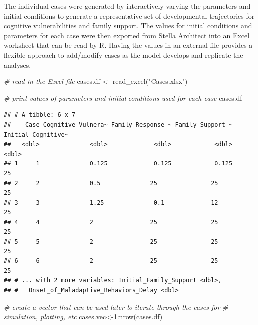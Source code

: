 \documentclass[
]{article}
\newenvironment{Shaded}{\begin{snugshade}}{\end{snugshade}}
\newcommand{\CommentTok}[1]{\textcolor[rgb]{0.56,0.35,0.01}{\textit{#1}}}
\newcommand{\DecValTok}[1]{\textcolor[rgb]{0.00,0.00,0.81}{#1}}
\newcommand{\FunctionTok}[1]{\textcolor[rgb]{0.00,0.00,0.00}{#1}}
\newcommand{\NormalTok}[1]{#1}
\newcommand{\OtherTok}[1]{\textcolor[rgb]{0.56,0.35,0.01}{#1}}
\newcommand{\SpecialCharTok}[1]{\textcolor[rgb]{0.00,0.00,0.00}{#1}}
\newcommand{\StringTok}[1]{\textcolor[rgb]{0.31,0.60,0.02}{#1}}
\begin{document}
The individual cases were generated by interactively varying the
parameters and initial conditions to generate a representative set of
developmental trajectories for cognitive vulnerabilities and family
support. The values for initial conditions and parameters for each case
were then exported from Stella Architect into an Excel worksheet that
can be read by R. Having the values in an external file provides a
flexible approach to add/modify cases as the model develops and
replicate the analyses.

\begin{Shaded}
\begin{Highlighting}[]
\CommentTok{\# read in the Excel file}
\NormalTok{cases.df }\OtherTok{\textless{}{-}} \FunctionTok{read\_excel}\NormalTok{(}\StringTok{"Cases.xlsx"}\NormalTok{)}

\CommentTok{\# print values of parameters and initial conditions used for each case}
\NormalTok{cases.df}
\end{Highlighting}
\end{Shaded}

\begin{verbatim}
## # A tibble: 6 x 7
##    Case Cognitive_Vulnera~ Family_Response_~ Family_Support_~ Initial_Cognitive~
##   <dbl>              <dbl>             <dbl>            <dbl>              <dbl>
## 1     1              0.125             0.125            0.125                 25
## 2     2              0.5              25               25                     25
## 3     3              1.25              0.1             12                     25
## 4     4              2                25               25                     25
## 5     5              2                25               25                     25
## 6     6              2                25               25                     25
## # ... with 2 more variables: Initial_Family_Support <dbl>,
## #   Onset_of_Maladaptive_Behaviors_Delay <dbl>
\end{verbatim}

\begin{Shaded}
\begin{Highlighting}[]
\CommentTok{\# create a vector that can be used later to iterate through the cases for }
\CommentTok{\# simulation, plotting, etc}
\NormalTok{cases.vec}\OtherTok{\textless{}{-}}\DecValTok{1}\SpecialCharTok{:}\FunctionTok{nrow}\NormalTok{(cases.df) }
\end{Highlighting}
\end{Shaded}
\end{document}
